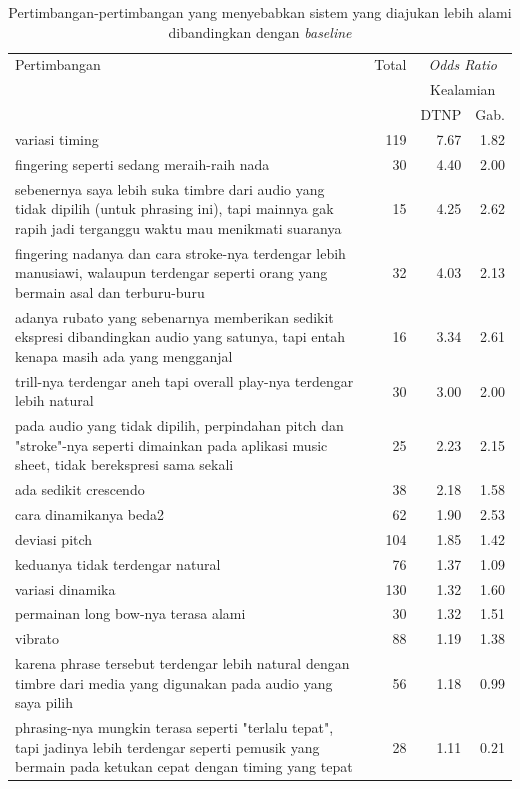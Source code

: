 \begin{table}[htbp]
  \begin{center}
	\caption{Pertimbangan-pertimbangan yang menyebabkan sistem yang diajukan lebih alami dibandingkan dengan \textit{baseline}}\label{tab-pertimbangan-oddsratio-morenatural}
	\begin{tabular}{|p{}|r|r|r|}
	\hline
Pertimbangan&	Total&	\multicolumn{2}{|c|}{\textit{Odds Ratio}}\\
&	&	\multicolumn{2}{|c|}{Kealamian}\\
\cline{3-4}
&	&	DTNP	&Gab.
\\\hline
variasi timing&	119&	7.67&	1.82\\\hline
fingering seperti sedang meraih-raih nada&	30&	4.40&	2.00\\\hline
sebenernya saya lebih suka timbre dari audio yang tidak dipilih (untuk phrasing ini), tapi mainnya gak rapih jadi terganggu waktu mau menikmati suaranya&	15&	4.25&	2.62\\\hline
fingering nadanya dan cara stroke-nya terdengar lebih manusiawi, walaupun terdengar seperti orang yang bermain asal dan terburu-buru&	32&	4.03&	2.13\\\hline
adanya rubato yang sebenarnya memberikan sedikit ekspresi dibandingkan audio yang satunya, tapi entah kenapa masih ada yang mengganjal&	16&	3.34&	2.61\\\hline
trill-nya terdengar aneh tapi overall play-nya terdengar lebih natural&	30&	3.00&	2.00\\\hline
pada audio yang tidak dipilih, perpindahan pitch dan "stroke"-nya seperti dimainkan pada aplikasi music sheet, tidak berekspresi sama sekali&	25&	2.23&	2.15\\\hline
ada sedikit crescendo&	38&	2.18&	1.58\\\hline
cara dinamikanya beda2&	62&	1.90&	2.53\\\hline
deviasi pitch&	104&	1.85&	1.42\\\hline
keduanya tidak terdengar natural&	76&	1.37&	1.09\\\hline
variasi dinamika&	130&	1.32&	1.60\\\hline
permainan long bow-nya terasa alami&	30&	1.32&	1.51\\\hline
vibrato&	88&	1.19&	1.38\\\hline
karena phrase tersebut terdengar lebih natural dengan timbre dari media yang digunakan pada audio yang saya pilih&	56&	1.18&	0.99\\\hline
phrasing-nya mungkin terasa seperti "terlalu tepat", tapi jadinya lebih terdengar seperti pemusik yang bermain pada ketukan cepat dengan timing yang tepat&	28&	1.11&	0.21\\\hline
\end{tabular}
  \end{center}
\end{table}

